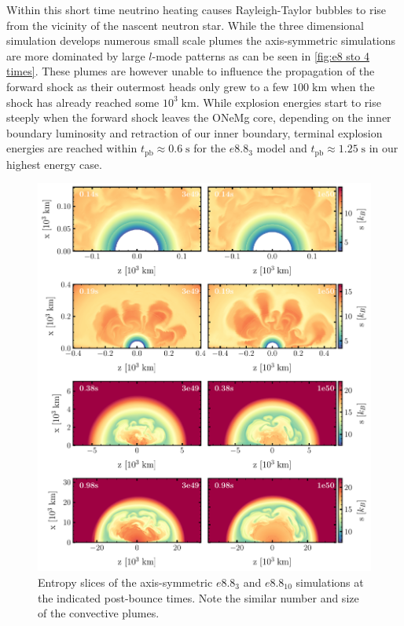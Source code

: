 \documentclass[fleqn,usenatbib]{mnras}
\begin{document}
Within this short time neutrino heating causes Rayleigh-Taylor bubbles to rise from the vicinity of the nascent neutron star. While the three dimensional simulation develops numerous small scale plumes the axis-symmetric simulations are more dominated by large $l$-mode patterns as can be seen in \autoref{fig:e8 sto 4 times}. These plumes are however unable to influence the propagation of the forward shock as their outermost heads only grew to a few $100 \;\mathrm{km}$ when the shock has already reached some $10^3\;\mathrm{km}$. 
While explosion energies start to rise steeply when the forward shock leaves the ONeMg core, depending on the inner boundary luminosity and retraction of our inner boundary, terminal explosion energies are reached within $t_{\mathrm{pb}}\approx  0.6\;\mathrm{s}$ for the $e8.8_{3}$ model and  $t_{\mathrm{pb}}\approx 1.25\;\mathrm{s}$ in our highest energy case. 

\begin{figure} %
 \includegraphics[width=\textwidth]{pic/e8_sto_cuts_2d_1e50_3e49.pdf}
 \caption{Entropy slices of the axis-symmetric $e8.8_{3}$ and  $e8.8_{10}$ simulations at the indicated post-bounce times. Note the similar number and size of the convective plumes. }
 \label{fig:e8 2d sto times}
\end{figure}
\end{document}
